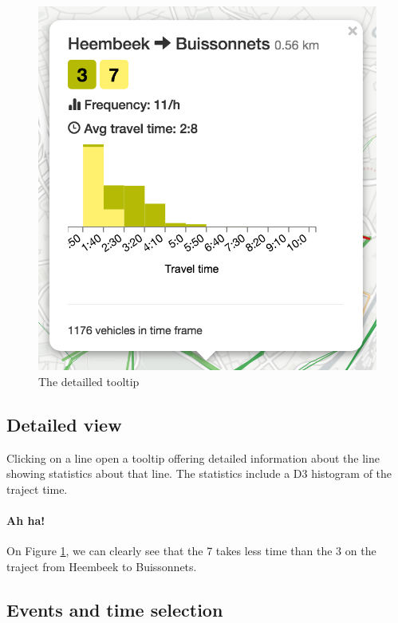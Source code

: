 \documentclass[11pt]{article}%
\begin{document}
\begin{minipage}{0.3\textwidth}
  \begin{figure}[H]
    \includegraphics[width=\textwidth]{images/popup1.png}
    \caption{\label{fig:popup} The detailled tooltip}
  \end{figure}
\end{minipage}\hfill
\begin{minipage}{0.6\textwidth}
    \subsection{Detailed view}
    Clicking on a line open a tooltip offering detailed information about the line showing statistics about that line. The statistics include a D3 histogram of the traject time.
    \paragraph{Ah ha!} On Figure \ref{fig:popup}, we can clearly see that the 7 takes less time than the 3 on the traject from Heembeek to Buissonnets.
\end{minipage}

\subsection{Events and time selection}
\end{document}
